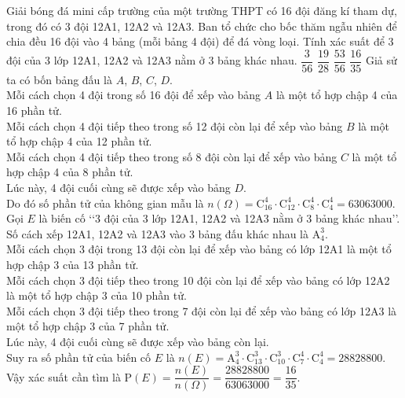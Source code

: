 \begin{ex}%
	Giải bóng đá mini cấp trường của một trường THPT có 16 đội đăng kí tham dự, trong đó có 3 đội 12A{\small 1}, 12A{\small 2} và 12A{\small 3}. Ban tổ chức cho bốc thăm ngẫu nhiên để chia đều 16 đội vào 4 bảng (mỗi bảng 4 đội) để đá vòng loại. Tính xác suất để 3 đội của 3 lớp 12A{\small 1}, 12A{\small 2} và 12A{\small 3} nằm ở 3 bảng khác nhau.
	\choice
	{$\dfrac{3}{56}$}
	{$\dfrac{19}{28}$}
	{$\dfrac{53}{56}$}
	{\True $\dfrac{16}{35}$}
	\loigiai
	{
		Giả sử ta có bốn bảng đấu là $A$, $B$, $C$, $D$.\\
		Mỗi cách chọn 4 đội trong số 16 đội để xếp vào bảng $A$ là một tổ hợp chập 4 của 16 phần tử.\\
		Mỗi cách chọn 4 đội tiếp theo trong số 12 đội còn lại để xếp vào bảng $B$ là một tổ hợp chập 4 của 12 phần tử.\\
		Mỗi cách chọn 4 đội tiếp theo trong số 8 đội còn lại để xếp vào bảng $C$ là một tổ hợp chập 4 của 8 phần tử.\\
		Lúc này, 4 đội cuối cùng sẽ được xếp vào bảng $D$.\\
		Do đó số phần tử của không gian mẫu là $n(\Omega)= \mathrm{C}_{16}^4 \cdot \mathrm{C}_{12}^4 \cdot \mathrm{C}_{8}^4 \cdot \mathrm{C}_{4}^4  = 63063000$.\\
		Gọi $E$ là biến cố \lq\lq 3 đội của 3 lớp 12A{\small 1}, 12A{\small 2} và 12A{\small 3} nằm ở 3 bảng khác nhau\rq\rq.\\
		Số cách xếp 12A{\small 1}, 12A{\small 2} và 12A{\small 3} vào 3 bảng đấu khác nhau là $\mathrm{A}_4^3$.\\		
		Mỗi cách chọn 3 đội trong 13 đội còn lại  để xếp vào bảng có lớp 12A{\small 1} là một tổ hợp chập 3 của 13 phần tử.\\		
		Mỗi cách chọn 3 đội tiếp theo trong 10 đội còn lại  để xếp vào bảng có lớp 12A{\small 2} là một tổ hợp chập 3 của 10 phần tử.\\		
		Mỗi cách chọn 3 đội tiếp theo trong 7 đội còn lại để xếp vào bảng có lớp 12A{\small 3} là một tổ hợp chập 3 của 7 phần tử.\\		
		Lúc này, 4 đội cuối cùng sẽ được xếp vào bảng còn lại.\\
		Suy ra số phần tử của biến cố $E$ là $n(E)= \mathrm{A}_4^3 \cdot \mathrm{C}_{13}^3 \cdot \mathrm{C}_{10}^3 \cdot \mathrm{C}_{7}^4 \cdot \mathrm{C}_{4}^4 = 28828800$.\\
		Vậy xác suất cần tìm là $\mathrm{P}(E)= \dfrac{n(E)}{n(\Omega)}= \dfrac{28828800}{63063000}= \dfrac{16}{35}$.
	}
\end{ex}

